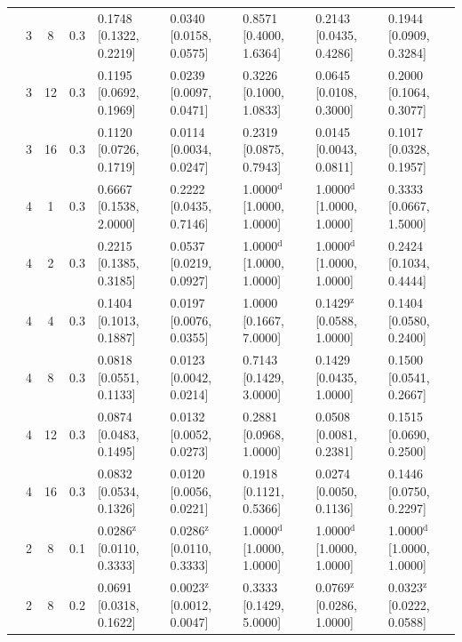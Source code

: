 \begin{tabular}{@{}cccclllll@{}}
 & 3 & 8 & 0.3 & 0.1748 {\tiny[0.1322, 0.2219]} & 0.0340 {\tiny[0.0158, 0.0575]} & 0.8571 {\tiny[0.4000, 1.6364]} & 0.2143 {\tiny[0.0435, 0.4286]} & 0.1944 {\tiny[0.0909, 0.3284]} \\
 & 3 & 12 & 0.3 & 0.1195 {\tiny[0.0692, 0.1969]} & 0.0239 {\tiny[0.0097, 0.0471]} & 0.3226 {\tiny[0.1000, 1.0833]} & 0.0645 {\tiny[0.0108, 0.3000]} & 0.2000 {\tiny[0.1064, 0.3077]} \\
 & 3 & 16 & 0.3 & 0.1120 {\tiny[0.0726, 0.1719]} & 0.0114 {\tiny[0.0034, 0.0247]} & 0.2319 {\tiny[0.0875, 0.7943]} & 0.0145 {\tiny[0.0043, 0.0811]} & 0.1017 {\tiny[0.0328, 0.1957]} \\
 & 4 & 1 & 0.3 & 0.6667 {\tiny[0.1538, 2.0000]} & 0.2222 {\tiny[0.0435, 0.7146]} & 1.0000$^{\mathrm{d}}$ {\tiny[1.0000, 1.0000]} & 1.0000$^{\mathrm{d}}$ {\tiny[1.0000, 1.0000]} & 0.3333 {\tiny[0.0667, 1.5000]} \\
 & 4 & 2 & 0.3 & 0.2215 {\tiny[0.1385, 0.3185]} & 0.0537 {\tiny[0.0219, 0.0927]} & 1.0000$^{\mathrm{d}}$ {\tiny[1.0000, 1.0000]} & 1.0000$^{\mathrm{d}}$ {\tiny[1.0000, 1.0000]} & 0.2424 {\tiny[0.1034, 0.4444]} \\
 & 4 & 4 & 0.3 & 0.1404 {\tiny[0.1013, 0.1887]} & 0.0197 {\tiny[0.0076, 0.0355]} & 1.0000 {\tiny[0.1667, 7.0000]} & 0.1429$^{\mathrm{z}}$ {\tiny[0.0588, 1.0000]} & 0.1404 {\tiny[0.0580, 0.2400]} \\
 & 4 & 8 & 0.3 & 0.0818 {\tiny[0.0551, 0.1133]} & 0.0123 {\tiny[0.0042, 0.0214]} & 0.7143 {\tiny[0.1429, 3.0000]} & 0.1429 {\tiny[0.0435, 1.0000]} & 0.1500 {\tiny[0.0541, 0.2667]} \\
 & 4 & 12 & 0.3 & 0.0874 {\tiny[0.0483, 0.1495]} & 0.0132 {\tiny[0.0052, 0.0273]} & 0.2881 {\tiny[0.0968, 1.0000]} & 0.0508 {\tiny[0.0081, 0.2381]} & 0.1515 {\tiny[0.0690, 0.2500]} \\
 & 4 & 16 & 0.3 & 0.0832 {\tiny[0.0534, 0.1326]} & 0.0120 {\tiny[0.0056, 0.0221]} & 0.1918 {\tiny[0.1121, 0.5366]} & 0.0274 {\tiny[0.0050, 0.1136]} & 0.1446 {\tiny[0.0750, 0.2297]} \\
 & 2 & 8 & 0.1 & 0.0286$^{\mathrm{z}}$ {\tiny[0.0110, 0.3333]} & 0.0286$^{\mathrm{z}}$ {\tiny[0.0110, 0.3333]} & 1.0000$^{\mathrm{d}}$ {\tiny[1.0000, 1.0000]} & 1.0000$^{\mathrm{d}}$ {\tiny[1.0000, 1.0000]} & 1.0000$^{\mathrm{d}}$ {\tiny[1.0000, 1.0000]} \\
 & 2 & 8 & 0.2 & 0.0691 {\tiny[0.0318, 0.1622]} & 0.0023$^{\mathrm{z}}$ {\tiny[0.0012, 0.0047]} & 0.3333 {\tiny[0.1429, 5.0000]} & 0.0769$^{\mathrm{z}}$ {\tiny[0.0286, 1.0000]} & 0.0323$^{\mathrm{z}}$ {\tiny[0.0222, 0.0588]} \\

\end{tabular}
